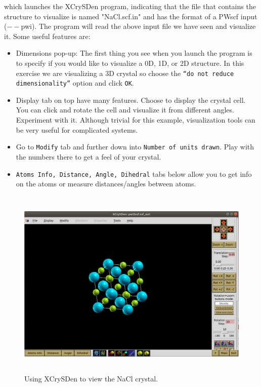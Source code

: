 \documentclass[12pt]{article}
\begin{document}
    which launches the XCrySDen program, indicating that the file that contains the structure to visualize is named "NaCl.scf.in" and has the format of
    a PWscf input ($--$pwi). 
    The program will read the above input file we have seen and visualize it.
    Some useful features are:
    \begin{itemize}
        \item Dimensions pop-up: The first thing you see when you launch the program is 
         to specify if you would like to visualize a 0D, 1D, or 2D structure.
        In this exercise we are visualizing a 3D crystal so choose the {\tt ``do not reduce dimensionality''} option and click {\tt OK}. 
        \item Display tab on top have many features. 
        Choose to display the crystal cell. You can click and rotate the cell and visualize it from 
        different angles. Experiment with it. Although trivial for this example, visualization tools can be very useful for complicated systems.
        \item Go to {\tt Modify} tab and further down into {\tt Number of units drawn}. 
        Play with the numbers there to get a feel of your crystal. 
        \item {\tt Atoms Info, Distance, Angle, Dihedral} tabs below allow you to get info on the atoms or measure distances/angles between atoms.
    \end{itemize}

\begin{figure}[h!]
\centering
\includegraphics[height=260pt]{xcrysden.png}
\caption{Using XCrySDen to view the NaCl crystal.}
\label{xcrysden}
\end{figure}
\end{document}
